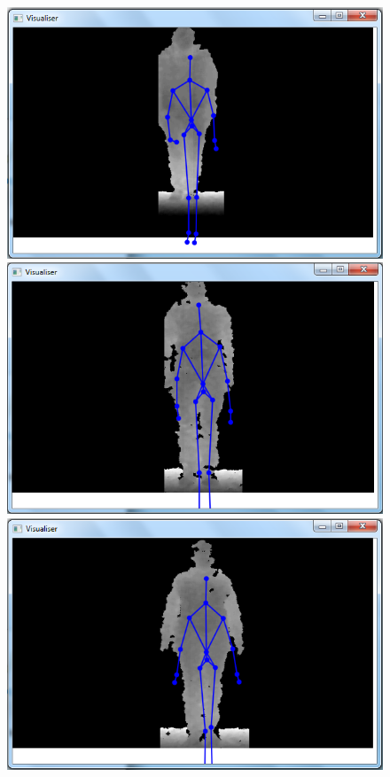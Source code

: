 \begin{figure}[h]
\begin{center}
\includegraphics[scale=0.3]{images/bernie_iso} 
\includegraphics[scale=0.3]{images/page} 
\includegraphics[scale=0.3]{images/steffat} 

\end{center}
\end{figure}
